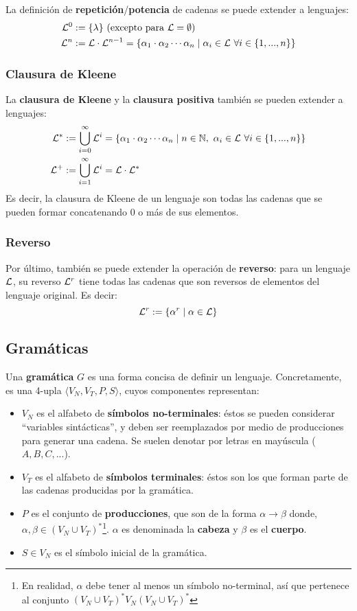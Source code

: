La definición de \textbf{repetición}/\textbf{potencia} de cadenas se puede extender a lenguajes:
$$
\begin{aligned}
    \mathcal{L}^0 & := \{\lambda\} \text{ (excepto para $\mathcal{L} = \emptyset$)}\\
    \mathcal{L}^n & := \mathcal{L} \cdot \mathcal{L}^{n - 1} = \{\alpha_1 \cdot \alpha_2 \cdots \alpha_n \mid \alpha_i \in \mathcal{L}\ \forall i \in \{1, ..., n\}\}
\end{aligned}
$$

\subsubsection{Clausura de Kleene}

La \textbf{clausura de Kleene} y la \textbf{clausura positiva} también se pueden extender a lenguajes:
$$
\begin{aligned}
    \mathcal{L}^* & := \bigcup_{i=0}^\infty \mathcal{L}^i = \{\alpha_1 \cdot \alpha_2 \cdots \alpha_n \mid n \in \mathbb{N},\ \alpha_i \in \mathcal{L}\ \forall i \in \{1, ..., n\}\} \\
    \mathcal{L}^+ & := \bigcup_{i=1}^\infty \mathcal{L}^i = \mathcal{L} \cdot \mathcal{L}^*
\end{aligned}
$$
Es decir, la clausura de Kleene de un lenguaje son todas las cadenas que se pueden formar concatenando 0 o más de sus elementos.

\subsubsection{Reverso}

Por último, también se puede extender la operación de \textbf{reverso}: para un lenguaje $\mathcal{L}$, su reverso $\mathcal{L}^r$ tiene todas las cadenas que son reversos de elementos del lenguaje original. Es decir:
$$\mathcal{L}^r := \{\alpha^r \mid \alpha \in \mathcal{L}\}$$

\subsection{Gramáticas}

Una \textbf{gramática} $G$ es una forma concisa de definir un lenguaje. Concretamente, es una 4-upla $\langle V_N, V_T, P, S \rangle$, cuyos componentes representan:
\begin{itemize}
    \item $V_N$ es el alfabeto de \textbf{símbolos no-terminales}: éstos se pueden considerar ``variables sintácticas'', y deben ser reemplazados por medio de producciones para generar una cadena. Se suelen denotar por letras en mayúscula ($A, B, C, ...$).
    \item $V_T$ es el alfabeto de \textbf{símbolos terminales}: éstos son los que forman parte de las cadenas producidas por la gramática.
    \item $P$ es el conjunto de \textbf{producciones}, que son de la forma $\alpha \to \beta$ donde, $\alpha, \beta \in (V_N \cup V_T)^*$\footnote{En realidad, $\alpha$ debe tener al menos un símbolo no-terminal, así que pertenece al conjunto $(V_N \cup V_T)^* V_N (V_N \cup V_T)^*$}. $\alpha$ es denominada la \textbf{cabeza} y $\beta$ es el \textbf{cuerpo}.
    \item $S \in V_N$ es el símbolo inicial de la gramática.
\end{itemize}

